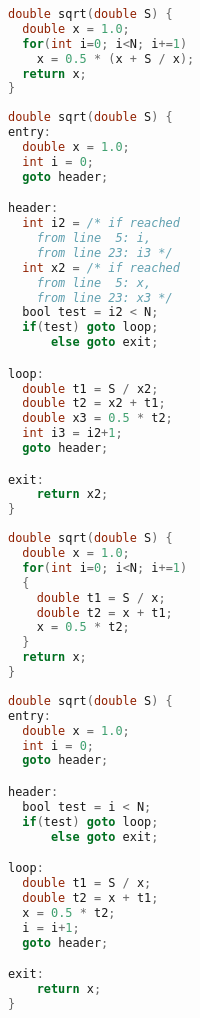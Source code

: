 \begin{minipage}{0.48\textwidth}
\begin{lstlisting}[language=C,captionpos=t,title=
   {{\bf(a)} {} C source function\leftskip=0pt}]
double sqrt(double S) {
  double x = 1.0;
  for(int i=0; i<N; i+=1)
    x = 0.5 * (x + S / x);
  return x;
}
\end{lstlisting}
\begin{lstlisting}[language=C,captionpos=t,title=
   {{\bf(d)} {} The SSA property is introduced\leftskip=0pt}]
double sqrt(double S) {
entry:
  double x = 1.0;
  int i = 0;
  goto header;

header:
  int i2 = /* if reached
    from line  5: i,
    from line 23: i3 */
  int x2 = /* if reached
    from line  5: x,
    from line 23: x3 */
  bool test = i2 < N;
  if(test) goto loop;
      else goto exit;

loop:
  double t1 = S / x2;
  double t2 = x2 + t1;
  double x3 = 0.5 * t2;
  int i3 = i2+1;
  goto header;

exit:
    return x2;
}
\end{lstlisting}
\end{minipage}
\hfill
\begin{minipage}{0.48\textwidth}
\begin{lstlisting}[language=C,basicstyle=\linespread{1.06451612903}\ttfamily,
                   captionpos=t,title=
   {{\bf(b)} {} Complex expressions are broken down\leftskip=0pt}]
double sqrt(double S) {
  double x = 1.0;
  for(int i=0; i<N; i+=1)
  {
    double t1 = S / x;
    double t2 = x + t1;
    x = 0.5 * t2;
  }
  return x;
}
\end{lstlisting}
\begin{lstlisting}[language=C,basicstyle=\linespread{1.06451612903}\ttfamily,
                   captionpos=t,title=
   {{\bf(c)} {} Structured control flow is expanded\leftskip=0pt}]
double sqrt(double S) {
entry:
  double x = 1.0;
  int i = 0;
  goto header;

header:
  bool test = i < N;
  if(test) goto loop;
      else goto exit;

loop:
  double t1 = S / x;
  double t2 = x + t1;
  x = 0.5 * t2;
  i = i+1;
  goto header;

exit:
    return x;
}
\end{lstlisting}
\end{minipage}
